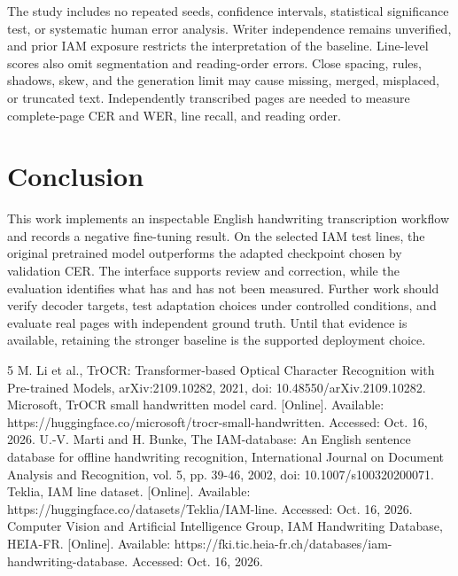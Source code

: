 \documentclass[conference]{IEEEtran}
\begin{document}
The study includes no repeated seeds, confidence intervals, statistical significance test, or systematic human error analysis. Writer independence remains unverified, and prior IAM exposure restricts the interpretation of the baseline. Line-level scores also omit segmentation and reading-order errors. Close spacing, rules, shadows, skew, and the generation limit may cause missing, merged, misplaced, or truncated text. Independently transcribed pages are needed to measure complete-page CER and WER, line recall, and reading order.
\section{Conclusion}
This work implements an inspectable English handwriting transcription workflow and records a negative fine-tuning result. On the selected IAM test lines, the original pretrained model outperforms the adapted checkpoint chosen by validation CER. The interface supports review and correction, while the evaluation identifies what has and has not been measured. Further work should verify decoder targets, test adaptation choices under controlled conditions, and evaluate real pages with independent ground truth. Until that evidence is available, retaining the stronger baseline is the supported deployment choice.
\begin{thebibliography}{5}
 M. Li et al., TrOCR: Transformer-based Optical Character Recognition with Pre-trained Models, arXiv:2109.10282, 2021, doi: 10.48550/arXiv.2109.10282.
 Microsoft, TrOCR small handwritten model card. [Online]. Available: https://huggingface.co/microsoft/trocr-small-handwritten. Accessed: Oct. 16, 2026.
 U.-V. Marti and H. Bunke, The IAM-database: An English sentence database for offline handwriting recognition, International Journal on Document Analysis and Recognition, vol. 5, pp. 39-46, 2002, doi: 10.1007/s100320200071.
 Teklia, IAM line dataset. [Online]. Available: https://huggingface.co/datasets/Teklia/IAM-line. Accessed: Oct. 16, 2026.
 Computer Vision and Artificial Intelligence Group, IAM Handwriting Database, HEIA-FR. [Online]. Available: https://fki.tic.heia-fr.ch/databases/iam-handwriting-database. Accessed: Oct. 16, 2026.
\end{thebibliography}
\end{document}
